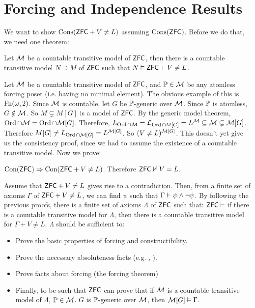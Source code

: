 \documentclass{article}
\begin{document}
    \section{Forcing and Independence Results}
    We want to show $\operatorname{Cons}(\mathsf{ZFC} + V \neq L)$ assuming $\operatorname{Cons}(\mathsf{ZFC})$. Before we do that, we need one theorem:
    \begin{fancythm}{}
        Let $\mathcal{M}$ be a countable transitive model of $\mathsf{ZFC}$, then there is a countable transitive model $N \supseteq M$ of $\mathsf{ZFC}$ such that $N \vDash \mathsf{ZFC} + V \neq L$.
    \end{fancythm}
    \proof Let $\mathcal{M}$ be a countable transitive model of $\mathsf{ZFC}$, and $\mathbb{P} \in \mathcal{M}$ be any atomless forcing poset (i.e. having no minimal element). The obvious example of this is $\operatorname{Fn}(\omega, 2)$. Since $\mathcal{M}$ is countable, let $G$ be $\mathbb{P}$-generic over $\mathcal{M}$. Since $\mathbb{P}$ is atomless, $G \notin \mathcal{M}$. So $M \subsetneq M[G]$ is a model of $\mathsf{ZFC}$. By the generic model theorem, $\operatorname{Ord} \cap \mathcal{M} = \operatorname{Ord} \cap \mathcal{M}[G]$. Therefore, $L_{\operatorname{Ord} \cap \mathcal{M}} = \mathcal{L}_{\operatorname{Ord} \cap M[G]} = L^{\mathcal{M}} \subseteq \mathcal{M} \subsetneq \mathcal{M}[G]$. Therefore $M[G] \neq L_{\operatorname{Ord} \cap \mathcal{M}[G]} = L^{\mathcal{M}[G]}$. So $(V \neq L)^{\mathcal{M}[G]}$. \endproof
    This doesn't yet give us the consistency proof, since we had to assume the existence of a countable transitive model. Now we prove: \begin{fancythm}{}
        $\operatorname{Con}(\mathsf{ZFC}) \Rightarrow \operatorname{Con}(\mathsf{ZFC} + V \neq L)$. Therefore $\mathsf{ZFC} \nvdash V=L$.
    \end{fancythm}
    \proof Assume that $\mathsf{ZFC} + V \neq L$ gives rise to a contradiction. Then, from a finite set of axioms $\Gamma$ of $\mathsf{ZFC} + V \neq L$, we can find $\psi$ such that $\Gamma \vdash \psi \wedge \neg \psi$. By following the previous proofs, there is a finite set of axioms $\Lambda$ of $\mathsf{ZFC}$ such that: $\mathsf{ZFC} \vdash$ if there is a countable transitive model for $\Lambda$, then there is a countable transitive model for $\Gamma + V \neq L$. \gap
$\Lambda$ should be sufficient to: \begin{itemize}
        \item Prove the basic properties of forcing and constructibility.
        \item Prove the necessary absoluteness facts (e.g. , ).
        \item Prove facts about forcing (the forcing theorem)
        \item Finally, to be such that $\mathsf{ZFC}$ can prove that if $\mathcal{M}$ is a countable transitive model of $\Lambda$, $\mathbb{P} \in \mathcal{M}$. $G$ is $\mathbb{P}$-generic over $\mathcal{M}$, then $\mathcal{M}[G] \vDash \Gamma$.
    \end{itemize}
\end{document}
